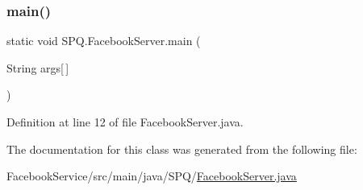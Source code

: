 \subsubsection{\texorpdfstring{main()}{main()}}
{\footnotesize\ttfamily static void S\+P\+Q.\+Facebook\+Server.\+main (\begin{DoxyParamCaption}\item[{String}]{args\mbox{[}$\,$\mbox{]} }\end{DoxyParamCaption})\hspace{0.3cm}{\ttfamily [static]}}



Definition at line 12 of file Facebook\+Server.\+java.



The documentation for this class was generated from the following file\+:\begin{DoxyCompactItemize}
\item 
Facebook\+Service/src/main/java/\+S\+P\+Q/\mbox{\hyperlink{_facebook_server_8java}{Facebook\+Server.\+java}}\end{DoxyCompactItemize}
